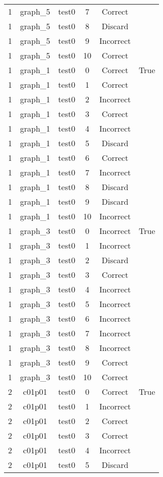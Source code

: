 \begin{longtable}{|c|c|c|c|c|c|}
1 & graph\_5 & test0 & 7 & Correct &  \\ 
1 & graph\_5 & test0 & 8 & Discard &  \\ 
1 & graph\_5 & test0 & 9 & Incorrect &  \\ 
1 & graph\_5 & test0 & 10 & Correct &  \\ 
1 & graph\_1 & test0 & 0 & Correct & True \\ 
1 & graph\_1 & test0 & 1 & Correct &  \\ 
1 & graph\_1 & test0 & 2 & Incorrect &  \\ 
1 & graph\_1 & test0 & 3 & Correct &  \\ 
1 & graph\_1 & test0 & 4 & Incorrect &  \\ 
1 & graph\_1 & test0 & 5 & Discard &  \\ 
1 & graph\_1 & test0 & 6 & Correct &  \\ 
1 & graph\_1 & test0 & 7 & Incorrect &  \\ 
1 & graph\_1 & test0 & 8 & Discard &  \\ 
1 & graph\_1 & test0 & 9 & Discard &  \\ 
1 & graph\_1 & test0 & 10 & Incorrect &  \\ 
1 & graph\_3 & test0 & 0 & Incorrect & True \\ 
1 & graph\_3 & test0 & 1 & Incorrect &  \\ 
1 & graph\_3 & test0 & 2 & Discard &  \\ 
1 & graph\_3 & test0 & 3 & Correct &  \\ 
1 & graph\_3 & test0 & 4 & Incorrect &  \\ 
1 & graph\_3 & test0 & 5 & Incorrect &  \\ 
1 & graph\_3 & test0 & 6 & Incorrect &  \\ 
1 & graph\_3 & test0 & 7 & Incorrect &  \\ 
1 & graph\_3 & test0 & 8 & Incorrect &  \\ 
1 & graph\_3 & test0 & 9 & Correct &  \\ 
1 & graph\_3 & test0 & 10 & Correct &  \\ 
2 & c01p01 & test0 & 0 & Correct & True \\ 
2 & c01p01 & test0 & 1 & Incorrect &  \\ 
2 & c01p01 & test0 & 2 & Correct &  \\ 
2 & c01p01 & test0 & 3 & Correct &  \\ 
2 & c01p01 & test0 & 4 & Incorrect &  \\ 
2 & c01p01 & test0 & 5 & Discard &  \\ 

\end{longtable}
